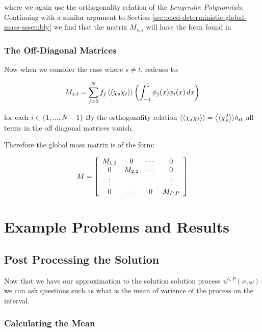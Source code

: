 where we again use the orthogonality relation of the \textit{Lengendre
Polynomials}. Continuing with a similar argument to Section
\ref{sec:oned-deterministic-global-mass-assembly} we find that the matrix
$M_{s,s}$ will have the form found in 

\subsubsection{The Off-Diagonal Matrices}

Now when we consider the case where $s \neq t$,
 redcues to:

\begin{equation}
    M_{s,t} = \sum_{j=0}^Nf_j\left\langle\langle\chi_s\chi_t\right\rangle\rangle\left(
        \int_{-1}^1\phi_j(x)\phi_i(x)\, dx
    \right)
\end{equation}

for each $i \in \{1,\ldots,N - 1\}$ By the orthogonality relation
$\left\langle\langle\chi_s\chi_t\right\rangle\rangle = \left\langle\langle\chi_s^2\right\rangle\rangle\delta_{st}$ all terms in the off
diagonal matrices vanish.

Therefore the global mass matrix is of the form:

\begin{equation}
    M = \left[\begin{array}{c c c c}
            M_{1,1} & 0 & \cdots & 0 \\
            0 & M_{2,2} & \cdots & 0 \\
            \vdots & & & \vdots \\
            0 & \cdots & 0 & M_{P,P}
    \end{array}\right]
\end{equation}

\section{Example Problems and Results}


\subsection{Post Processing the Solution}

Now that we have our approximation to the solution solution process
$u^{h,P}(x,\omega)$ we can ask questions such as what is the mean of varience
of the process on the interval.

\subsubsection{Calculating the Mean}

